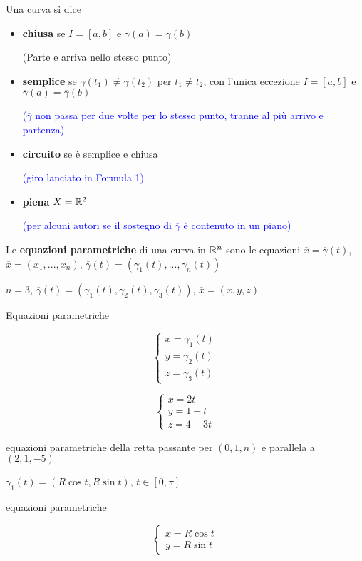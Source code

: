 Una curva si dice
\begin{itemize}
	\item \textbf{chiusa} se $I = [a,b]$ e $\overline{\gamma}(a)=\overline{\gamma}(b)$
	
	{\color{blue}(Parte e arriva nello stesso punto)}
	
	\item \textbf{semplice} se $\overline{\gamma}(t_1)\neq \overline{\gamma}(t_2)$ per $t_1 \neq t_2$, con l'unica eccezione $I =[a,b]$ e $\overline{\gamma}(a)=\overline{\gamma}(b)$ 
	
	\textcolor{blue}{($\overline{\gamma}$ non passa per due volte per lo stesso punto, tranne al più arrivo e partenza)}
	
	
	\item \textbf{circuito} se è semplice e chiusa 
	
	\textcolor{blue}{(giro lanciato in Formula 1)}
	
	\item \textbf{piena} $X =\mathbb{R}^2$ 
	
	\textcolor{blue}{(per alcuni autori se il sostegno di $\overline{\gamma}$ è contenuto in un piano)}
\end{itemize}


Le \textbf{equazioni parametriche} di una curva in $\mathbb{R}^n$ sono le equazioni $\overline{x}=\overline{\gamma}(t)$, $\overline{x}=(x_1,...,x_n)$, $\overline{\gamma}(t)=(\gamma_1(t),...,\gamma_n(t))$

$n=3$, $\overline{\gamma}(t)=(\gamma_1(t),\gamma_2(t),\gamma_3 (t))$, $\overline{x}=(x,y,z)$

Equazioni parametriche

$$\begin{cases}
	x=\gamma_1(t)\\
	y=\gamma_2(t)\\
	z=\gamma_3(t)
\end{cases}$$

\begin{exbar}
	$$\begin{cases}
		x=2t\\
		y=1+t\\
		z=4-3t
	\end{cases}$$
	
	equazioni parametriche della retta passante per $(0,1,n)$ e parallela a $(2,1,-5)$
	
	$\overline{\gamma}_1(t)=(R\cos t, R \sin t)$, $t \in [0,\pi]$ 
	
	equazioni parametriche 
	
	$$\begin{cases}
		x=R \cos t\\
		y=R \sin t
	\end{cases}$$
\end{exbar}


